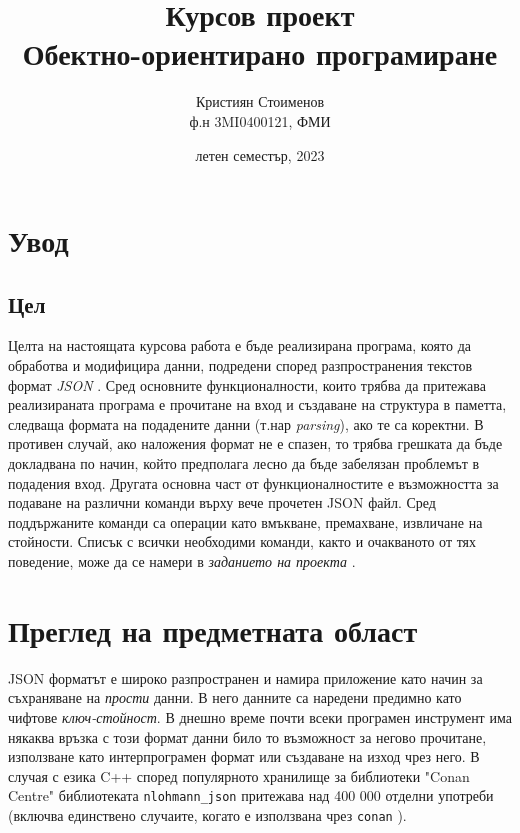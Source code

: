 \documentclass[10pt]{article}
\title{Курсов проект \\ {\Large Обектно-ориентирано програмиране}}
\author{Кристиян Стоименов \\ {ф.н 3MI0400121, ФМИ}}
\date{летен семестър, 2023}
\begin{document}
\maketitle

\section{Увод}

\subsection{Цел}

Целта на настоящата курсова работа е бъде реализирана програма, която да обработва и модифицира данни, подредени според разпространения текстов формат \textit{JSON} \autocite{ecma404}. Сред основните функционалности, които трябва да притежава реализираната програма е прочитане на вход и създаване на структура в паметта, следваща формата на подадените данни (т.нар \textit{parsing}), ако те са коректни. В противен случай, ако наложения формат не е спазен, то трябва грешката да бъде докладвана по начин, който предполага лесно да бъде забелязан проблемът в подадения вход. Другата основна част от функционалностите е възможността за подаване на различни команди върху вече прочетен JSON файл. Сред поддържаните команди са операции като вмъкване, премахване, извличане на стойности. Списък с всички необходими команди, както и очакваното от тях поведение, може да се намери в \textit{заданието на проекта} \autocite{json-problem}.

\section{Преглед на предметната област}

\par
JSON форматът е широко разпространен и намира приложение като начин за съхраняване на \textit{прости} данни. В него данните са наредени предимно като чифтове \textit{ключ-стойност}. В днешно време почти всеки програмен инструмент има някаква връзка с този формат данни било то възможност за негово прочитане, използване като интерпрограмен формат или създаване на изход чрез него. В случая с езика C++ според популярното хранилище за библиотеки "Conan Centre" \autocite{conan_centre} библиотеката \verb|nlohmann_json| \autocite{nlohmann_json} притежава над 400 000 отделни употреби (включва единствено случаите, когато е използвана чрез \verb|conan| \autocite{conan}).
\end{document}
